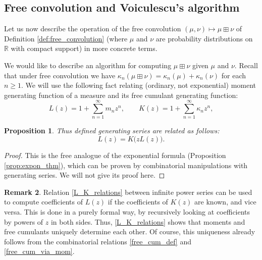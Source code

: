 \documentclass[letterpaper,11pt,oneside,reqno]{amsart}
\numberwithin{equation}{section}
\newtheorem{proposition}{Proposition}[section]
\theoremstyle{definition}
\newtheorem{remark}[proposition]{Remark}
\begin{document}

\subsection{Free convolution and Voiculescu's algorithm} %
\label{sub:free_convolution_and_voiculescu_s_algorithm}

Let us now describe the operation of the free convolution $(\mu,\nu)\mapsto \mu\boxplus \nu$
of Definition \ref{def:free_convolution}
(where $\mu$ and $\nu$ are probability distributions on $\mathbb{R}$ with compact
support) in more concrete terms.

We would like to describe an algorithm for computing $\mu\boxplus \nu$ given $\mu$ and $\nu$.
Recall that under free convolution we have $\kappa_n(\mu\boxplus\nu)=\kappa_n(\mu)+\kappa_n(\nu)$ for each $n\ge1$. 
We will use the following fact relating (ordinary, not exponential) moment generating function of a measure
and its free cumulant generating function:
\begin{equation}\label{L_K_definitions}
	L(z)=1+\sum_{n=1}^\infty m_nz^n,\qquad
	K(z)=1+\sum_{n=1}^\infty \kappa_nz^n,
\end{equation}
\begin{proposition}\label{prop:free_expon_thm}
	Thus defined generating series are related as follows:
	\begin{equation}\label{L_K_relations}
		L(z)=K\big(zL(z)\big).
	\end{equation}
\end{proposition}
\begin{proof}
	This is the free analogue of the exponential formula (Proposition \ref{prop:expon_thm}),
	which can be proven by combinatorial manipulations with generating series.
	We will not give its proof here.
\end{proof}
\begin{remark}\label{rmk:L_K_inversion_exists}
	Relation \eqref{L_K_relations} between infinite power series can be used to compute coefficients
	of $L(z)$ if the coefficients of $K(z)$ are known, and vice versa. This is done in a purely formal way,
	by recursively looking at coefficients by powers of $z$ in both sides. Thus, \eqref{L_K_relations} 
	shows that moments and free cumulants uniquely determine each other.
	Of course, this uniqueness already follows from the combinatorial relations 
	\eqref{free_cum_def} and \eqref{free_cum_via_mom}. 
\end{remark}
\end{document}
